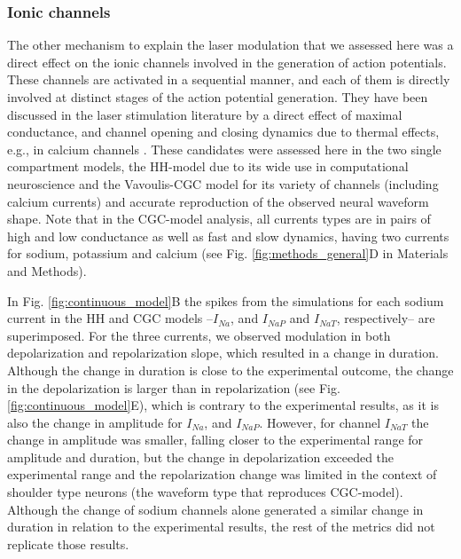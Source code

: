 \subsubsection{Ionic channels}
The other mechanism to explain the laser modulation that we assessed here was a direct effect on the ionic channels involved in the generation of action potentials. These channels are activated in a sequential manner, and each of them is directly involved at distinct stages of the action potential generation. They have been discussed in the laser stimulation literature \parencite{liang_temperature-dependent_2009,li_temporal_2013, rabbitt_heat_2016} by a direct effect of maximal conductance, and channel opening and closing dynamics due to thermal effects, e.g., in calcium channels \parencite{albert_trpv4_2012, barrett_pulsed_2018}. These candidates were assessed here in the two single compartment models, the HH-model due to its wide use in computational neuroscience and the Vavoulis-CGC model for its variety of channels (including calcium currents) and accurate reproduction of the observed neural waveform shape. Note that in the CGC-model analysis, all currents types are in pairs of high and low conductance as well as fast and slow dynamics, having two currents for sodium, potassium and calcium (see Fig. \ref{fig:methods_general}D in Materials and Methods).

In Fig. \ref{fig:continuous_model}B the spikes from the simulations for each sodium current in the HH and CGC models --$I_{Na}$, and $I_{NaP}$ and $I_{NaT}$, respectively-- are superimposed. For the three currents, we observed modulation in both depolarization and repolarization slope, which resulted in a change in duration. Although the change in duration is close to the experimental outcome, the change in the depolarization is larger than in repolarization (see Fig. \ref{fig:continuous_model}E), which is contrary to the experimental results, as it is also the change in amplitude for $I_{Na}$, and $I_{NaP}$. However, for channel $I_{NaT}$ the change in amplitude was smaller, falling closer to the experimental range for amplitude and duration, but the change in depolarization exceeded the experimental range and the repolarization change was limited in the context of shoulder type neurons (the waveform type that reproduces CGC-model). Although the change of sodium channels alone generated a similar change in duration in relation to the experimental results, the rest of the metrics did not replicate those results.

